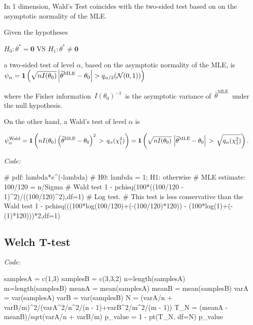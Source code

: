 In 1 dimension, Wald's Test coincides with the two-sided test based on on the asymptotic normality of the MLE.

Given the hypotheses

$H_0: \displaystyle  \theta ^* = \mathbf{0}$ VS $H_1: \displaystyle  \theta ^* \neq \mathbf{0}$	 	 
 	 		 	 
a two-sided test of level $\alpha$, based on the asymptotic normality of the MLE, is $\displaystyle  \displaystyle \psi _\alpha =\mathbf{1}\left(\sqrt{nI(\theta _0)} \left| \widehat{\theta }^{\text {MLE}} -\theta _0 \right|>q_{\alpha /2}(\mathcal{N}(0,1))\right)$

 		 	 
where the Fisher information $\, I(\theta _0)^{-1}\,$ is the asymptotic variance of $\, \widehat{\theta }^{\text {MLE}}\,$ under the null hypothesis.

On the other hand, a Wald's test of level $\alpha$ is

$\displaystyle  \displaystyle \psi ^{\text {Wald}}_\alpha	= \displaystyle \mathbf{1}\left(nI(\theta _0) \left(\widehat{\theta }^{\text {MLE}} -\theta _0\right)^2\, >\, q_{\alpha }(\chi ^2_1)\right) = \displaystyle \mathbf{1}\left(\sqrt{nI(\theta _0)} \, \left| \widehat{\theta }^{\text {MLE}} -\theta _0 \right|\, >\, \sqrt{q_{\alpha }(\chi ^2_1)}\right).$			 	 
 
\textit{Code: }
\begin{spverbatim}
# pdf: lambda*e^(-lambda)
# H0: lambda = 1; H1: otherwise
# MLE estimate: 100/120 = n/Sigma
# Wald test
1 - pchisq(100*((100/120 - 1)^2)/((100/120)^2),df=1)
# Log test. 
# This test is less conservative than the Wald test
1 - pchisq(((100*log(100/120)+(-(100/120)*120)) - (100*log(1)+(-(1)*120)))*2,df=1)
\end{spverbatim}

\subsection{Welch T-test}
\textit{Code: }
\begin{spverbatim}
samplesA = c(1,3)
samplesB = c(3,3,2)
n=length(samplesA)
m=length(samplesB)
meanA = mean(samplesA)
meanB = mean(samplesB)
varA = var(samplesA)
varB = var(samplesB)
N = (varA/n + varB/m)^2/(varA^2/n^2/(n - 1)+varB^2/m^2/(m - 1))
T_N = (meanA - meanB)/sqrt(varA/n + varB/m)
p_value = 1 - pt(T_N, df=N)
p_value
\end{spverbatim}

